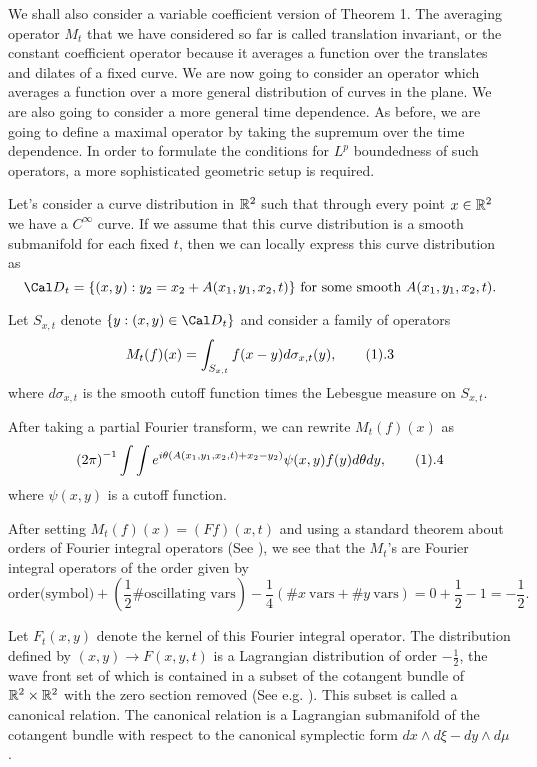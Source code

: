 We shall also consider a variable coefficient version of Theorem 1.
The averaging operator $M_t$ that we have considered so far is called
translation invariant, or the constant coefficient operator because it
averages a function over the translates and dilates of a fixed curve. We are
now going to consider an operator which averages a function over
a more general distribution of curves in the plane. We are also going to
consider a more general time dependence. As before, we are going to define
a maximal operator by taking the supremum over the time dependence. In order
to formulate the conditions for $L^p$ boundedness of such operators, a more
sophisticated geometric setup is required. 

Let's consider a curve distribution in $ {\Bbb R}^2$ such that through 
every point $x\in {\Bbb R}^2$ we have a $C^\infty$ curve. 
If we assume that 
this curve distribution is a smooth submanifold for each fixed $t$, 
then we can locally 
express this curve distribution as 
$$ {\Cal D}_t=\{(x,y):y_2=x_2+A(x_1,y_1,x_2,t)\} \ \text{for some smooth} \ 
A(x_1,y_1,x_2,t).$$

Let $S_{x,t}$ denote $ \{ y:(x,y) \in {\Cal D}_t \}$    and consider a 
family of operators
$$ M_t(f)(x)=\int_{S_{x,t}} f(x-y) d{\sigma}_{x,t}(y), \tag1.3$$where    
$d{\sigma}_{x,t}$ is the  
smooth cutoff function times the Lebesgue measure on  $S_{x,t}.$ 

After taking a partial Fourier transform, we can rewrite $M_t(f)(x)$ as 
$$ {(2\pi)}^{-1} \int \int e^{i\theta(A(x_1,y_1,x_2,t)+x_2-y_2)} \psi(x,y) f(y)
d\theta dy, \tag1.4$$ where $\psi(x,y)$ is a cutoff function.

After setting $M_t(f)(x)=(Ff)(x,t)$ and using a standard theorem about orders
of Fourier integral operators (See \cite{So1}), 
we see that the $M_t$'s are Fourier 
integral operators of the order given by 
$$ \text{order(symbol)}+(\frac{1}{2}  
\# \text{oscillating 
vars})-\frac{1}{4} (\# x \ \text{vars}+ \# y \  \text{vars})=0+
\frac{1}{2}-1=-\frac{1}{2}.$$

Let $F_t(x,y)$ denote the kernel of this Fourier integral operator. 
The distribution defined by $(x,y)\rightarrow F(x,y,t)$ is a Lagrangian
distribution of order $-\frac{1}{2}$, the wave front set of which is contained 
in a subset of the cotangent bundle of ${\Bbb R}^2 \times {\Bbb R}^2$ with the
zero section removed (See e.g. \cite{So1}). This subset is called a canonical
relation. The canonical relation is a Lagrangian submanifold of the 
cotangent bundle with respect to the canonical symplectic form 
$dx\wedge d\xi-dy\wedge d\mu$. 

